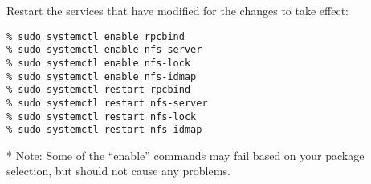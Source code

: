 Restart the services that have modified for the changes to take effect:
\begin{verbatim}
% sudo systemctl enable rpcbind
% sudo systemctl enable nfs-server
% sudo systemctl enable nfs-lock
% sudo systemctl enable nfs-idmap
% sudo systemctl restart rpcbind
% sudo systemctl restart nfs-server
% sudo systemctl restart nfs-lock
% sudo systemctl restart nfs-idmap
\end{verbatim}

* Note: Some of the ``enable'' commands may fail based on your package selection, but should not cause any problems.
\setlength{\parindent}{\savedparindentnfs}%
